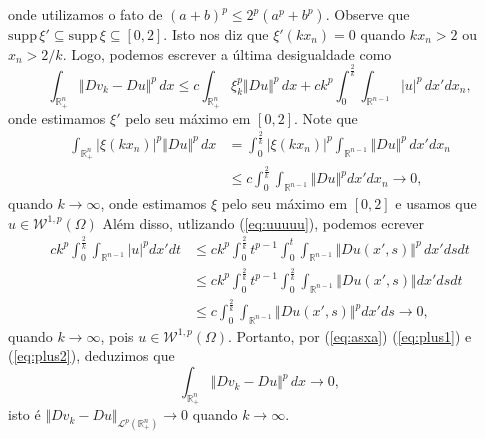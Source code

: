 \documentclass[a4paper, 11pt]{book}
\theoremstyle{definition}
\newcommand{\bR}{\mathbb{R}}
\newcommand{\cL}{\mathcal{L}}
\newcommand{\cW}{\mathcal{W}}
\newcommand{\supp}{\mathrm{supp}\,}
\begin{document}
\begin{prf}
    onde utilizamos o fato de $(a + b)^p \leqslant 2^p (a^p + b^p)$.
    Observe que $\supp \xi' \subseteq \supp \xi \subseteq [0,2]$. Isto nos diz que $\xi'(kx_n) = 0$ quando $kx_n > 2$ ou $x_n > 2/k$.
    Logo, podemos escrever a última desigualdade como
    \begin{equation}
        \int_{\bR^n_+} \Vert Dv_k - Du \Vert^p \,dx \leqslant c \int_{\bR^{n}_+} \xi_k^p \Vert Du \Vert^p \,dx + ck^p \int_{0}^{\frac{2}{k}} \int_{\bR^{n-1}} |u|^p \,dx'dx_n,
    \end{equation}
    onde estimamos $\xi'$ pelo seu máximo em $[0,2]$.
    Note que
    \begin{equation} \label{eq:plus1}
        \begin{aligned}
            \int_{\bR^{n}_+} |\xi(kx_n)|^p \Vert Du \Vert^p \,dx &= \int_{0}^{\frac{2}{k}} |\xi(kx_n)|^p \int_{\bR^{n-1}} \Vert Du \Vert^p \,dx' dx_n\\
            &\leqslant c \int_{0}^{\frac{2}{k}} \int_{\bR^{n-1}} \Vert Du \Vert^p dx' dx_n \longrightarrow 0,
        \end{aligned}
    \end{equation}
    quando $k \to \infty$, onde estimamos $\xi$ pelo seu máximo em $[0,2]$ e usamos que $u \in \cW^{1,p}(\Omega)$ 
    Além disso, utlizando (\ref{eq:uuuuu}), podemos ecrever
    \begin{equation} \label{eq:plus2}
        \begin{aligned}
            ck^p \int_{0}^{\frac{2}{k}} \int_{\bR^{n-1}} |u|^p dx'dt &\leqslant ck^p \int_{0}^{\frac{2}{k}} t^{p-1} \int_{0}^{t} \int_{\bR^{n-1}} \Vert Du(x'\!,s) \Vert^p \,dx'\!ds dt\\ 
            &\leqslant ck^p\int_0^{\frac{2}{k}} t^{p-1} \int_0^{\frac{2}{k}}  \int_{\bR^{n-1}} \Vert Du(x'\!,s) \Vert dx'\!dsdt\\
            &\leqslant c \int_0^{\frac{2}{k}} \int_{\bR^{n-1}} \Vert Du(x'\!,s) \Vert^p dx'ds \longrightarrow 0,
        \end{aligned}
    \end{equation}
    quando $k \to \infty$, pois $u \in \cW^{1,p}(\Omega)$.
    Portanto, por (\ref{eq:asxa}) (\ref{eq:plus1}) e (\ref{eq:plus2}), deduzimos que
    \[
        \int_{\bR^n_+} \Vert Dv_k - Du \Vert^p \,dx \to 0,
    \]
    isto é $\Vert Dv_k - Du \Vert_{\cL^p(\bR^n_+)} \to 0$ quando $k \to \infty$.


\end{prf}
\end{document}
